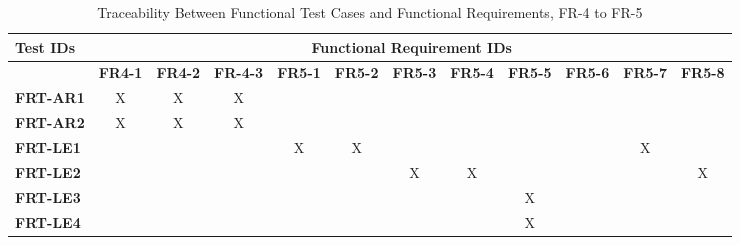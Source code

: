 \documentclass[12pt, titlepage]{article}
\begin{document}
\begin{landscape}
	\begin{longtable}{|l|ccccccccccc|}
		\caption{Traceability Between Functional Test Cases and Functional Requirements, FR-4 to FR-5}                                                                                                                                                                                                  \\
		\hline
		\textbf{Test IDs}   & \multicolumn{11}{c|}{\textbf{Functional Requirement IDs}}                                                                                                                                                                                                                 \\
		\hline
		~                   & \textbf{FR4-1}  & \textbf{FR4-2} & \textbf{FR-4-3} & \textbf{FR5-1} & \textbf{FR5-2} & \textbf{FR5-3} & \textbf{FR5-4} & \textbf{FR5-5} & \textbf{FR5-6} & \textbf{FR5-7} & \textbf{FR5-8} \\
		\hline
		\textbf{FRT-AR1} & X                                                         & X             & X             & ~             & ~             & ~             & ~             & ~             & ~             & ~             & ~\\
		\textbf{FRT-AR2} & X                                                         & X             & X             & ~             & ~             & ~             & ~             & ~             & ~             & ~             & ~\\
		\textbf{FRT-LE1} & ~                                                         & ~             & ~             & X             & X             & ~             & ~             & ~             & ~             & X             & ~\\
		\textbf{FRT-LE2} & ~                                                         & ~             & ~             & ~             & ~             & X             & X             & ~             & ~             & ~             & X\\
		\textbf{FRT-LE3} & ~                                                         & ~             & ~             & ~             & ~             & ~             & ~             & X             & ~             & ~             & ~\\
		\textbf{FRT-LE4} & ~                                                         & ~             & ~             & ~             & ~             & ~             & ~             & X             & ~             & ~             & ~\\

\end{longtable}
\end{landscape}
\end{document}
